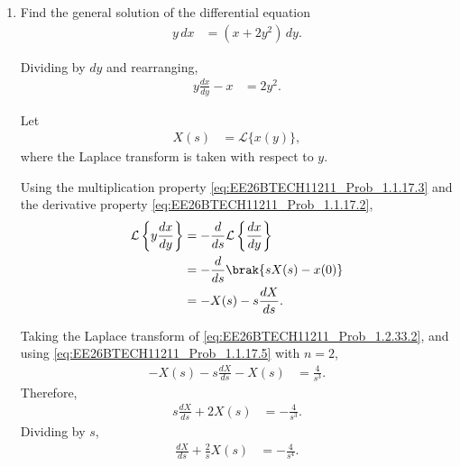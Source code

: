 \begin{enumerate}[label=\thesubsection.\arabic*, ref=\thesubsection.\theenumi]
Using the transform pair in \eqref{eq:EE26BTECH11211_Prob_1.1.17.8},
\begin{align}
w(t)&=\frac{1}{2}-\frac{1}{2}\ln(1+t).
\end{align}
From \eqref{eq:EE26BTECH11211_Prob_1.2.32.1}, $t=x-1$ and $w=x/y$. Therefore,
\begin{align}
\frac{x}{y}&=\frac{1}{2}-\frac{1}{2}\ln x\\
\frac{2x}{y}&=1-\ln x.
\end{align}
Thus, the particular solution is
\begin{align}
y=\frac{2x}{1-\ln x}.
\end{align}

\item
Find the general solution of the differential equation
\begin{align}
y\,dx&=(x+2y^2)\,dy.
\label{eq:EE26BTECH11211_Prob_1.2.33.1}
\end{align}

\solution

Dividing by $dy$ and rearranging,
\begin{align}
y\frac{dx}{dy}-x&=2y^2.
\label{eq:EE26BTECH11211_Prob_1.2.33.2}
\end{align}

Let
\begin{align}
X(s)&=\mathcal{L}\{x(y)\},
\end{align}
where the Laplace transform is taken with respect to $y$.

Using the multiplication property \eqref{eq:EE26BTECH11211_Prob_1.1.17.3}
and the derivative property \eqref{eq:EE26BTECH11211_Prob_1.1.17.2},
\begin{align}
\mathcal{L}\left\{y\frac{dx}{dy}\right\}
&=-\frac{d}{ds}\mathcal{L}\left\{\frac{dx}{dy}\right\}\\
&=-\frac{d}{ds}\brak{sX(s)-x(0)}\\
&=-X(s)-s\frac{dX}{ds}.
\end{align}

Taking the Laplace transform of \eqref{eq:EE26BTECH11211_Prob_1.2.33.2}, and using
\eqref{eq:EE26BTECH11211_Prob_1.1.17.5} with $n=2$,
\begin{align}
-X(s)-s\frac{dX}{ds}-X(s)&=\frac{4}{s^3}.
\end{align}
Therefore,
\begin{align}
s\frac{dX}{ds}+2X(s)&=-\frac{4}{s^3}.
\end{align}
Dividing by $s$,
\begin{align}
\frac{dX}{ds}+\frac{2}{s}X(s)&=-\frac{4}{s^4}.
\end{align}


\end{enumerate}
